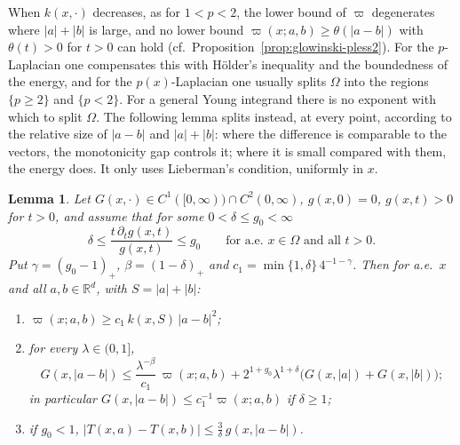 \documentclass[11pt]{amsart}
\newtheorem{lemma}[theorem]{Lemma}
\theoremstyle{definition}
\theoremstyle{remark}
\numberwithin{equation}{section}
\newcommand{\R}{\mathbb{R}}
\newcommand{\abs}[1]{\lvert #1\rvert}
\begin{document}
When $k(x,\cdot)$ decreases, as for $1<p<2$, the lower bound of $\varpi$ degenerates where $\abs a+\abs b$ is large, and no lower bound $\varpi(x;a,b)\ge\theta(\abs{a-b})$ with $\theta(t)>0$ for $t>0$ can hold (cf.\ Proposition~\ref{prop:glowinski-pless2}). For the $p$-Laplacian one compensates this with H\"older's inequality and the boundedness of the energy, and for the $p(x)$-Laplacian one usually splits $\Omega$ into the regions $\{p\ge2\}$ and $\{p<2\}$. For a general Young integrand there is no exponent with which to split $\Omega$. The following lemma splits instead, at every point, according to the relative size of $\abs{a-b}$ and $\abs a+\abs b$: where the difference is comparable to the vectors, the monotonicity gap controls it; where it is small compared with them, the energy does. It only uses Lieberman's condition, uniformly in $x$.

\begin{lemma}\label{lem:UM-L}
Let $G(x,\cdot)\in C^1([0,\infty))\cap C^2(0,\infty)$, $g(x,0)=0$, $g(x,t)>0$ for $t>0$, and assume that for some $0<\delta\le g_0<\infty$
\begin{equation}\tag{L}\label{eq:L}
\delta\le\frac{t\,\partial_tg(x,t)}{g(x,t)}\le g_0\qquad\text{for a.e.\ }x\in\Omega\text{ and all }t>0 .
\end{equation}
Put $\gamma=(g_0-1)_+$, $\beta=(1-\delta)_+$ and $c_1=\min\{1,\delta\}\,4^{-1-\gamma}$. Then for a.e.\ $x$ and all $a,b\in\R^d$, with $S=\abs a+\abs b$:
\begin{enumerate}[label=\textup{(\roman*)}]
\item $\varpi(x;a,b)\ge c_1\,k(x,S)\,\abs{a-b}^2$;
\item for every $\lambda\in(0,1]$,
\[
G(x,\abs{a-b})\le\frac{\lambda^{-\beta}}{c_1}\,\varpi(x;a,b)+2^{1+g_0}\lambda^{1+\delta}\big(G(x,\abs a)+G(x,\abs b)\big);
\]
in particular $G(x,\abs{a-b})\le c_1^{-1}\varpi(x;a,b)$ if $\delta\ge1$;
\item if $g_0<1$, $\abs{T(x,a)-T(x,b)}\le\frac3\delta\,g(x,\abs{a-b})$.
\end{enumerate}
\end{lemma}
\end{document}
